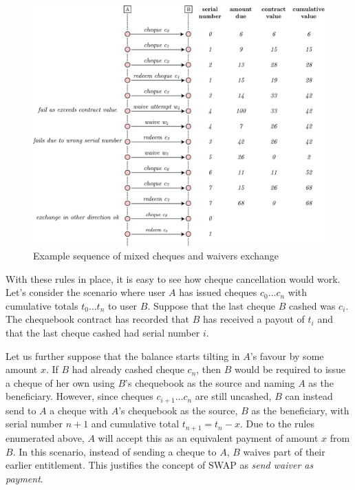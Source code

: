 \begin{figure}[htbp]
\centering
\includegraphics[width=\textwidth]{fig/waivers-diagram-2_new.pdf}
\caption[Example sequence of mixed cheques and waivers exchange \statusgreen]{Example sequence of mixed cheques and waivers exchange}
\label{fig:waivers-diagram}
\end{figure}

With these rules in place, it is easy to see how cheque cancellation would work. Let's consider the scenario where user $A$ has issued cheques $c_0 \ldots c_n$ with cumulative totals $t_0 \ldots t_n$ to user $B$. Suppose that the last cheque $B$ cashed was $c_i$. The chequebook contract has recorded that $B$ has received a payout of $t_i$ and that the last cheque cashed had serial number $i$.

Let us further suppose that the balance starts tilting in $A$'s favour by some amount $x$. If $B$ had already cashed cheque $c_n$, then $B$ would be required to issue a cheque of her own using $B$'s chequebook as the source and naming $A$ as the beneficiary. However, since cheques $c_{i+1} \ldots c_n$  are still uncashed, $B$ can instead send to $A$ a cheque with $A$'s chequebook as the source, $B$ as the beneficiary, with serial number $n+1$ and cumulative total $t_{n+1} = t_n - x$. Due to the rules enumerated above, $A$ will accept this as an equivalent payment of amount $x$ from $B$.  In this scenario, instead of sending a cheque to $A$, $B$ waives part of their earlier entitlement. This justifies the concept of SWAP as \emph{send waiver as payment}.

